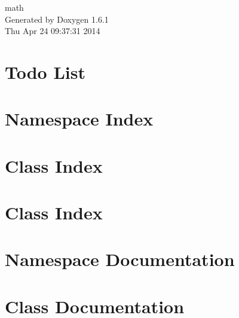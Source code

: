 \documentclass[a4paper]{book}
\begin{document}
\hypersetup{pageanchor=false}
\begin{titlepage}
\vspace*{7cm}
\begin{center}
{\Large math }\\
\vspace*{1cm}
{\large Generated by Doxygen 1.6.1}\\
\vspace*{0.5cm}
{\small Thu Apr 24 09:37:31 2014}\\
\end{center}
\end{titlepage}
\clearemptydoublepage
{}
\tableofcontents
\clearemptydoublepage
{}
\hypersetup{pageanchor=true}
\chapter{Todo List}
\label{todo}
\hypertarget{todo}{}

\chapter{Namespace Index}

\chapter{Class Index}

\chapter{Class Index}

\chapter{Namespace Documentation}




\chapter{Class Documentation}






































\printindex
\end{document}
